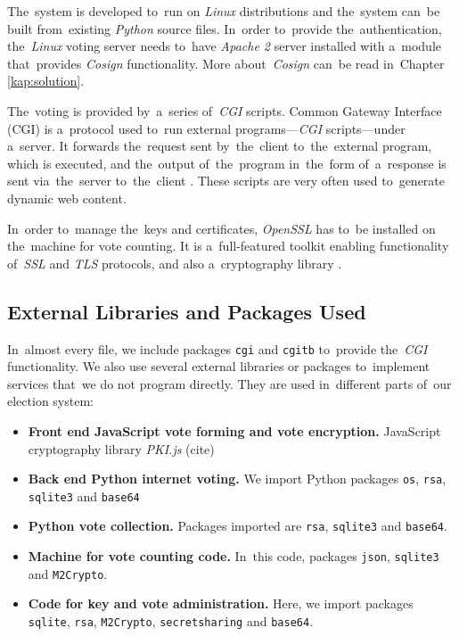 The~system is developed to~run on \emph{Linux} distributions and the~system can~be built from~existing \emph{Python} source files. In~order to~provide the~authentication, the~\emph{Linux} voting server needs to~have \emph{Apache 2} server installed with a~module that~provides \emph{Cosign} functionality. %
More about~\emph{Cosign} can~be read in~Chapter \ref{kap:solution}.

The~voting is provided by~a~series of~\emph{CGI} scripts. Common Gateway Interface (CGI) is a~protocol used to~run external programs—\emph{CGI} scripts—under a~server. It forwards the~request sent by~the~client to~the~external program, which is executed, and the~output of~the~program in~the~form of~a~response is sent via~the~server to~the~client \cite{CGI}. These scripts are very often used to~generate dynamic web content.

In~order to~manage the~keys and certificates, \emph{OpenSSL} has to~be installed on the~machine for vote counting. It is a~full-featured toolkit enabling functionality of~\emph{SSL} and \emph{TLS} protocols, and also a~cryptography library \cite{OpenSSL}.

\subsection{External Libraries and Packages Used} 
In~almost every file, we include packages \texttt{cgi} and \texttt{cgitb} to~provide the~\emph{CGI} functionality. We also use several external libraries or packages to~implement services that~we do not program directly. They are used in~different parts of~our election system:
\begin{itemize}
\item \textbf{Front end JavaScript vote forming and vote encryption.} JavaScript cryptography library \emph{PKI.js} (cite)
\item \textbf{Back end Python internet voting.} We import Python packages \texttt{os}, \texttt{rsa}, \texttt{sqlite3} and \texttt{base64}
\item \textbf{Python vote collection.} Packages imported are \texttt{rsa}, \texttt{sqlite3} and \texttt{base64}.
\item \textbf{Machine for vote counting code.} In~this code, packages \texttt{json}, \texttt{sqlite3} and \texttt{M2Crypto}.
\item \textbf{Code for key and vote administration.} Here, we import packages \texttt{sqlite}, \texttt{rsa}, \texttt{M2Crypto}, \texttt{secretsharing} and \texttt{base64}.
\end{itemize}

